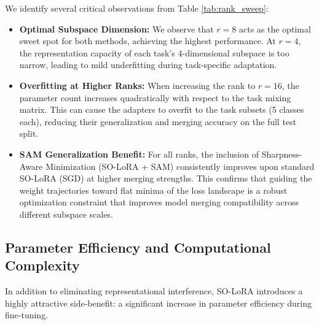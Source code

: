 \documentclass{article}
\theoremstyle{plain}
\theoremstyle{definition}
\theoremstyle{remark}
\begin{document}
We identify several critical observations from Table \ref{tab:rank_sweep}:
\begin{itemize}
    \item \textbf{Optimal Subspace Dimension:} We observe that $r=8$ acts as the optimal sweet spot for both methods, achieving the highest performance. At $r=4$, the representation capacity of each task's 4-dimensional subspace is too narrow, leading to mild underfitting during task-specific adaptation.
    \item \textbf{Overfitting at Higher Ranks:} When increasing the rank to $r=16$, the parameter count increases quadratically with respect to the task mixing matrix. This can cause the adapters to overfit to the task subsets (5 classes each), reducing their generalization and merging accuracy on the full test split.
    \item \textbf{SAM Generalization Benefit:} For all ranks, the inclusion of Sharpness-Aware Minimization (SO-LoRA + SAM) consistently improves upon standard SO-LoRA (SGD) at higher merging strengths. This confirms that guiding the weight trajectories toward flat minima of the loss landscape is a robust optimization constraint that improves model merging compatibility across different subspace scales.
\end{itemize}

\subsection{Parameter Efficiency and Computational Complexity}

In addition to eliminating representational interference, SO-LoRA introduces a highly attractive side-benefit: a significant increase in parameter efficiency during fine-tuning.
\end{document}

